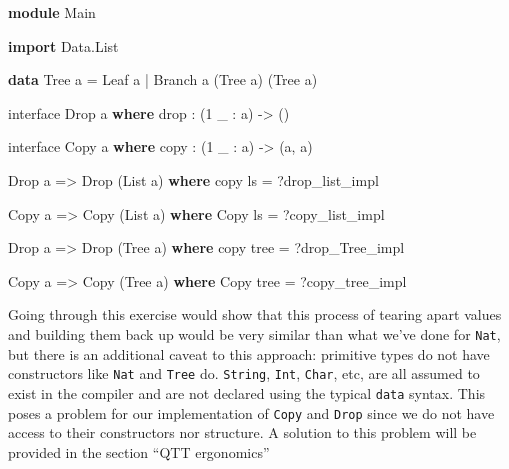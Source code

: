\documentclass[
]{article}
\newenvironment{Shaded}{}{}
\newcommand{\DataTypeTok}[1]{\textcolor[rgb]{0.56,0.13,0.00}{#1}}
\newcommand{\DecValTok}[1]{\textcolor[rgb]{0.25,0.63,0.44}{#1}}
\newcommand{\FunctionTok}[1]{\textcolor[rgb]{0.02,0.16,0.49}{#1}}
\newcommand{\KeywordTok}[1]{\textcolor[rgb]{0.00,0.44,0.13}{\textbf{#1}}}
\newcommand{\NormalTok}[1]{#1}
\newcommand{\OperatorTok}[1]{\textcolor[rgb]{0.40,0.40,0.40}{#1}}
\newcommand{\OtherTok}[1]{\textcolor[rgb]{0.00,0.44,0.13}{#1}}
\begin{document}
\begin{Shaded}
\begin{Highlighting}[]
\KeywordTok{module} \DataTypeTok{Main}

\KeywordTok{import} \DataTypeTok{Data.List}

\KeywordTok{data} \DataTypeTok{Tree}\NormalTok{ a }\OtherTok{=} \DataTypeTok{Leaf}\NormalTok{ a }\OperatorTok{|} \DataTypeTok{Branch}\NormalTok{ a (}\DataTypeTok{Tree}\NormalTok{ a) (}\DataTypeTok{Tree}\NormalTok{ a)}

\NormalTok{interface }\DataTypeTok{Drop}\NormalTok{ a }\KeywordTok{where}
    \FunctionTok{drop} \OperatorTok{:}\NormalTok{ (}\DecValTok{1}\NormalTok{ \_ }\OperatorTok{:}\NormalTok{ a) }\OtherTok{{-}\textgreater{}}\NormalTok{ ()}

\NormalTok{interface }\DataTypeTok{Copy}\NormalTok{ a }\KeywordTok{where}
\NormalTok{    copy }\OperatorTok{:}\NormalTok{ (}\DecValTok{1}\NormalTok{ \_ }\OperatorTok{:}\NormalTok{ a) }\OtherTok{{-}\textgreater{}}\NormalTok{ (a, a)}

\DataTypeTok{Drop}\NormalTok{ a }\OtherTok{=\textgreater{}} \DataTypeTok{Drop}\NormalTok{ (}\DataTypeTok{List}\NormalTok{ a) }\KeywordTok{where}
\NormalTok{    copy ls }\OtherTok{=} \OperatorTok{?}\NormalTok{drop\_list\_impl}

\DataTypeTok{Copy}\NormalTok{ a }\OtherTok{=\textgreater{}} \DataTypeTok{Copy}\NormalTok{ (}\DataTypeTok{List}\NormalTok{ a) }\KeywordTok{where}
    \DataTypeTok{Copy}\NormalTok{ ls }\OtherTok{=} \OperatorTok{?}\NormalTok{copy\_list\_impl}

\DataTypeTok{Drop}\NormalTok{ a }\OtherTok{=\textgreater{}} \DataTypeTok{Drop}\NormalTok{ (}\DataTypeTok{Tree}\NormalTok{ a) }\KeywordTok{where}
\NormalTok{    copy tree }\OtherTok{=} \OperatorTok{?}\NormalTok{drop\_Tree\_impl}

\DataTypeTok{Copy}\NormalTok{ a }\OtherTok{=\textgreater{}} \DataTypeTok{Copy}\NormalTok{ (}\DataTypeTok{Tree}\NormalTok{ a) }\KeywordTok{where}
    \DataTypeTok{Copy}\NormalTok{ tree }\OtherTok{=} \OperatorTok{?}\NormalTok{copy\_tree\_impl}
\end{Highlighting}
\end{Shaded}

Going through this exercise would show that this process of tearing
apart values and building them back up would be very similar than what
we've done for \texttt{Nat}, but there is an additional caveat to this
approach: primitive types do not have constructors like \texttt{Nat} and
\texttt{Tree} do. \texttt{String}, \texttt{Int}, \texttt{Char}, etc, are
all assumed to exist in the compiler and are not declared using the
typical \texttt{data} syntax. This poses a problem for our
implementation of \texttt{Copy} and \texttt{Drop} since we do not have
access to their constructors nor structure. A solution to this problem
will be provided in the section ``QTT ergonomics''
\end{document}
